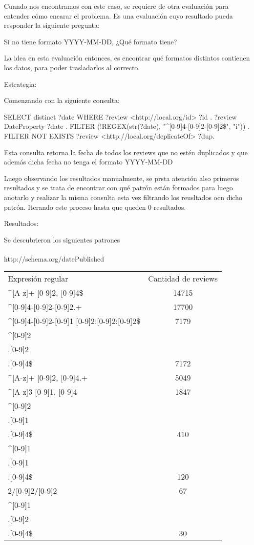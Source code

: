Cuando nos encontramos con este caso, se requiere de otra evaluación para entender cómo encarar el problema. Es una evaluación cuyo resultado
pueda responder la siguiente pregunta:

Si no tiene formato YYYY-MM-DD, ¿Qué formato tiene?

La idea en esta evaluación entonces, es encontrar qué formatos distintos contienen los datos, para poder trasladarlos al correcto.

Estrategia:

Comenzando con la siguiente consulta:

SELECT distinct ?date 
WHERE{
?review <http://local.org/id> ?id .
?review {DateProperty} ?date .
FILTER (!REGEX(str(?date), "^[0-9]{4}-[0-9]{2}-[0-9]{2}\$", "i")) .
FILTER NOT EXISTS{
?review <http://local.org/deplicateOf> ?dup.
}
}

Esta consulta retorna la fecha de todos los reviews que no estén duplicados y que además dicha fecha no tenga el formato YYYY-MM-DD

Luego observando los resultados manualmente, se prsta atención also primeros resultados y se trata de encontrar con qué patrón están formados 
para luego anotarlo y realizar la misma consulta esta vez filtrando los reusltados ocn dicho patrón. Iterando este proceso hasta que 
queden 0 resultados.

Resultados:

Se descubrieron los siguientes patrones
\\
\\
http://schema.org/datePublished
\begin{tabular}{| l | c |}
Expresión regular & Cantidad de reviews\\
^[A-z]+ [0-9]{2}, [0-9]{4}\$ & 14715 \\
^[0-9]{4}-[0-9]{2}-[0-9]{2}.+ & 17700 \\
^[0-9]{4}-[0-9]{2}-[0-9]{1} [0-9]{2}:[0-9]{2}:[0-9]{2}\$ & 7179 \\
^[0-9]{2}\\.[0-9]{2}\\.[0-9]{4}\$ & 7172\\
^[A-z]+ [0-9]{2}, [0-9]{4}.+ & 5049\\
^[A-z]{3} [0-9]{1}, [0-9]{4} & 1847\\
^[0-9]{2}\\.[0-9]{1}\\.[0-9]{4}\$ & 410\\
^[0-9]{1}\\.[0-9]{1}\\.[0-9]{4}\$ & 120\\
[0-9]{2}/[0-9]{2}/[0-9]{2} & 67\\
^[0-9]{1}\\.[0-9]{2}\\.[0-9]{4}\$ & 30
\end{tabular}

